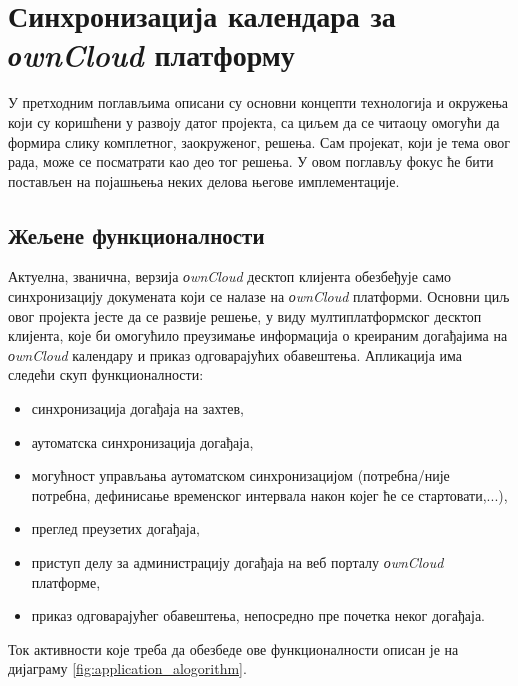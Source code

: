 \chapter{Синхронизација календара за \textit{оwnCloud} платформу}
\label{chap:ownCloudCalendarSynchronization}

У претходним поглављима описани су основни концепти технологија и окружења који су коришћени у развоју датог пројекта, са циљем да се читаоцу омогући да формира слику комплетног, заокруженог, решења. Сам пројекат, који је тема овог рада, може се посматрати као део тог решења. У овом поглављу фокус ће бити постављен на појашњења неких делова његове имплементације.

\section{Жељене функционалности}

Актуелна, званична, верзија \textit{оwnCloud} десктоп клијента обезбеђује само синхронизацију докумената који се налазе на \textit{оwnCloud} платформи. Основни циљ овог пројекта јесте да се развије решење, у виду мултиплатформског десктоп клијента, које би омогућило преузимање информација о креираним догађајима на \textit{оwnCloud} календару и приказ одговарајућих обавештења. Апликација има следећи скуп функционалности:
\begin{itemize}
	\item{синхронизација догађаја на захтев},
	\item{аутоматска синхронизација догађаја},
	\item{могућност управљања аутоматском синхронизацијом (потребна/није потребна, дефинисање временског интервала након којег ће се стартовати,...)},
	\item{преглед преузетих догађаја},
	\item{приступ делу за администрацију догађаја на веб порталу \textit{оwnCloud} платформе},
	\item{приказ одговарајућег обавештења, непосредно пре почетка неког догађаја}.	
\end{itemize}

Ток активности које треба да обезбеде ове функционалности описан је на дијаграму \ref{fig:application_alogorithm}.


